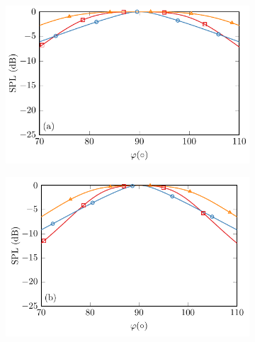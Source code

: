 \begin{figure}[!htb]
    \centering
    \begin{subfigure}{0.45\textwidth}
        \centering
        \includegraphics[width = \textwidth]{fig/Shi2015JasaFig4_500Hz_Compare_v3_211014C.pdf}
    \end{subfigure}
    \begin{subfigure}{0.45\textwidth}
        \centering
        \includegraphics[width = \textwidth]{fig/Shi2015JasaFig4_1000Hz_Compare_v3_21014D.pdf}
    \end{subfigure}
    \\
    \begin{subfigure}{0.45\textwidth}
        \centering

\end{subfigure}
\end{figure}
